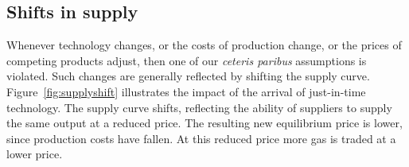 \newhtmlpage

\subsection*{Shifts in supply}

Whenever technology changes, or the costs of production change, or the
prices of competing products adjust, then one of our \textit{ceteris paribus}
assumptions is violated. Such changes are generally reflected by shifting
the supply curve. Figure~\ref{fig:supplyshift} illustrates the impact of the
arrival of just-in-time technology. The supply curve shifts, reflecting the
ability of suppliers to supply the same output at a reduced price. The
resulting new equilibrium price is lower, since production costs have
fallen. At this reduced price more gas is traded at a lower price.

